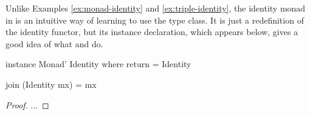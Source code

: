 
\begin{example}
  \label{ex:monad-identity-haskell}

  Unlike Examples \ref{ex:monad-identity} and
  \ref{ex:triple-identity}, the identity monad in \hask is an
  intuitive way of learning to use the  type
  class. It is just a redefinition of the identity functor, but its
  instance declaration, which appears below, gives a good idea of what
   and  do.

  \begin{codehaskell}
instance Monad' Identity where
  return = Identity

  join (Identity mx) = mx
  \end{codehaskell}

  \begin{proof}

    ...

  \end{proof}

\end{example}

